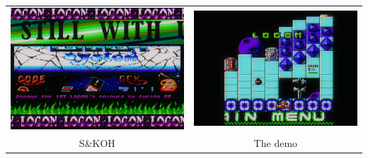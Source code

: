 \documentclass{beamer}
\begin{document}
\begin{frame}
\begin{columns}
\begin{column}{.62\linewidth}
{\begin{tabular}{@{}cc@{}}
	  \includegraphics[width=0.45\linewidth]{imgs/demo_skoh} &
	  \includegraphics[width=0.45\linewidth]{imgs/demo_thedemo}
	  \\

	  S\&KOH & The demo \\

	\end{tabular}
	}


\end{column}
\end{columns}
\end{frame}
\end{document}

